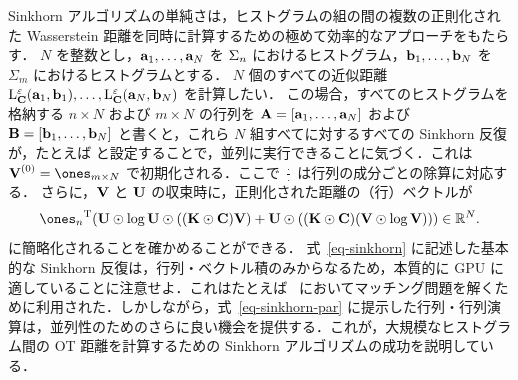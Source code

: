 \begin{rem}\label{rem-parallel} Sinkhorn アルゴリズムの単純さは，ヒストグラムの組の間の複数の正則化された Wasserstein 距離を同時に計算するための極めて効率的なアプローチをもたらす．
$N$ を整数とし，$\mathrm{\textbf{a}}_1,\ldots,\mathrm{\textbf{a}}_N$ を $\Sigma_n$ におけるヒストグラム，$\mathrm{\textbf{b}}_1,\ldots,\mathrm{\textbf{b}}_N$ を $\Sigma_m$ におけるヒストグラムとする．
$N$ 個のすべての近似距離 $\mathrm{L}_{\mathrm{\textbf{C}}}^\varepsilon(\mathrm{\textbf{a}}_1,\mathrm{\textbf{b}}_1),\dots,\mathrm{L}_{\mathrm{\textbf{C}}}^\varepsilon(\mathrm{\textbf{a}}_N,\mathrm{\textbf{b}}_N)$ を計算したい．
この場合，すべてのヒストグラムを格納する $n\times N$ および $m\times N$ の行列を $\mathrm{\textbf{A}}=[\mathrm{\textbf{a}}_1,\dots,\mathrm{\textbf{a}}_N]$ および $\mathrm{\textbf{B}}=[\mathrm{\textbf{b}}_1,\dots,\mathrm{\textbf{b}}_N]$ と書くと，これら $N$ 組すべてに対するすべての Sinkhorn 反復が，たとえば
\eql{\label{eq-sinkhorn-par}
	\itt{\UD} \eqdef \frac{\A}{\K \it{\VD}}
	\qandq
	\itt{\VD} \eqdef \frac{\B}{\transp{\K}\itt{\UD}},
}
と設定することで，並列に実行できることに気づく．これは $\init{\VD} = \ones_{m \times N}$ で初期化される．ここで $\frac{\cdot}{\cdot}$ は行列の成分ごとの除算に対応する．
さらに，$\mathrm{\textbf{V}}$ と $\mathrm{\textbf{U}}$ の収束時に，正則化された距離の（行）ベクトルが
$$ \transp{\ones_n} (    \UD\odot \log \UD \odot (   (\K\odot \C) \VD) +  \UD\odot(   (\K\odot \C)(\VD\odot \log \VD)    ) ) \in\RR^{N}.$$
に簡略化されることを確かめることができる．
式~\eqref{eq-sinkhorn} に記述した基本的な Sinkhorn 反復は，行列・ベクトル積のみからなるため，本質的に GPU に適していることに注意せよ．これはたとえば~\citet{slomp2011gpu} においてマッチング問題を解くために利用された．しかしながら，式~\eqref{eq-sinkhorn-par} に提示した行列・行列演算は，並列性のためのさらに良い機会を提供する．これが，大規模なヒストグラム間の OT 距離を計算するための Sinkhorn アルゴリズムの成功を説明している．
\end{rem}

